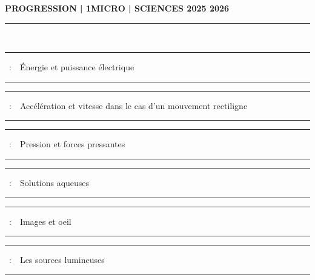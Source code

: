 \documentclass[11pt,a4paper]{article}
\newcounter{numchap}%
\newcommand{\chap}[1]{%
\addtocounter{numchap}{1}%
\textcolor{black}{Chapitre\,\thenumchap\,}\,#1%
}
\newcommand{\chapitre}[1]
{


\hrule
\vspace{5mm}
\large{ \chap~:~~#1 }
\vspace{5mm}
\hrule

\vfill 

}
\begin{document}
\center \LARGE{ \textbf{PROGRESSION | 1MICRO | SCIENCES 2025 2026}}
\\[0,5cm]

\normalsize

\hrule\

\vspace{1cm}

\begin{center}


\chapitre{Énergie et puissance électrique}
\chapitre{Accélération et vitesse dans le cas d'un mouvement rectiligne}
\chapitre{Pression et forces pressantes}
\chapitre{Solutions aqueuses}
\chapitre{Images et oeil}
\chapitre{Les sources lumineuses}


\end{center}
\end{document}
